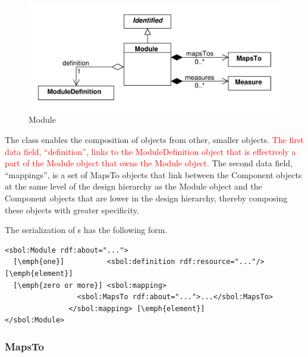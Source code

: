 \begin{figure}[ht]
\begin{center}
\includegraphics[scale=0.6]{uml/module}
\caption[]{Module}
\label{uml:module}
\end{center}
\end{figure}

The  class enables the composition of  objects from other, smaller  objects. \textcolor{red}{The first data field, ``definition'', links to the ModuleDefinition object that is effectively a part of the Module object that owns the Module object.} The second data field, ``mappings'', is a set of MapsTo objects that link between the Component objects at the same level of the design hierarchy as the Module object and the Component objects that are lower in the design hierarchy, thereby composing these objects with greater specificity.


The serialization of s has the following form.
\begin{lstlisting}
<sbol:Module rdf:about="...">
  [\emph{one}]          <sbol:definition rdf:resource="..."/>[\emph{element}]
  [\emph{zero or more}] <sbol:mapping>
                 <sbol:MapsTo rdf:about="...">...</sbol:MapsTo>
               </sbol:mapping> [\emph{element}]
</sbol:Module>
\end{lstlisting}


\subsubsection{MapsTo}
\label{sec:MapsTo}

